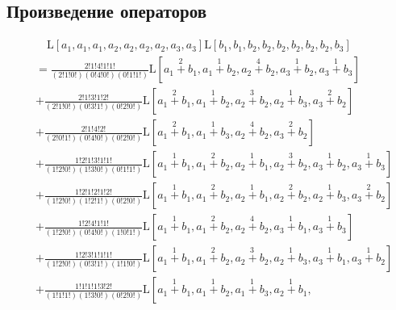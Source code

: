 
\subsection{Произведение операторов}

\begin{equation*} \begin{aligned}
& \quad
  \mathrm{L}[a_1, a_1, a_1, a_2, a_2, a_2, a_2, a_3, a_3] %
  \mathrm{L}[b_1, b_1, b_2, b_2, b_2, b_2, b_2, b_2, b_3] \\ &= %
  \frac{2!1!4!1!1!}{(2!1!0!)(0!4!0!)(0!1!1!)}
  \mathrm{L}\left[
  \stackrel{2}{a_1 + b_1},
  \stackrel{1}{a_1 + b_2},
  \stackrel{4}{a_2 + b_2},
  \stackrel{1}{a_3 + b_2},
  \stackrel{1}{a_3 + b_3}
  \right] \\ &
+ \frac{2!1!3!1!2!}{(2!1!0!)(0!3!1!)(0!2!0!)}
  \mathrm{L}\left[
  \stackrel{2}{a_1 + b_1},
  \stackrel{1}{a_1 + b_2},
  \stackrel{3}{a_2 + b_2},
  \stackrel{1}{a_2 + b_3},
  \stackrel{2}{a_3 + b_2}
  \right] \\ &
+ \frac{2!1!4!2!}{(2!0!1!)(0!4!0!)(0!2!0!)}
  \mathrm{L}\left[
  \stackrel{2}{a_1 + b_1},
  \stackrel{1}{a_1 + b_3},
  \stackrel{4}{a_2 + b_2},
  \stackrel{2}{a_3 + b_2}
  \right] \\ &
+ \frac{1!2!1!3!1!1!}{(1!2!0!)(1!3!0!)(0!1!1!)}
  \mathrm{L}\left[
  \stackrel{1}{a_1 + b_1},
  \stackrel{2}{a_1 + b_2},
  \stackrel{1}{a_2 + b_1},
  \stackrel{3}{a_2 + b_2},
  \stackrel{1}{a_3 + b_2},
  \stackrel{1}{a_3 + b_3}
  \right] \\ &
+ \frac{1!2!1!2!1!2!}{(1!2!0!)(1!2!1!)(0!2!0!)}
  \mathrm{L}\left[
  \stackrel{1}{a_1 + b_1},
  \stackrel{2}{a_1 + b_2},
  \stackrel{1}{a_2 + b_1},
  \stackrel{2}{a_2 + b_2},
  \stackrel{1}{a_2 + b_3},
  \stackrel{2}{a_3 + b_2}
  \right] \\ &
+ \frac{1!2!4!1!1!}{(1!2!0!)(0!4!0!)(1!0!1!)}
  \mathrm{L}\left[
  \stackrel{1}{a_1 + b_1},
  \stackrel{2}{a_1 + b_2},
  \stackrel{4}{a_2 + b_2},
  \stackrel{1}{a_3 + b_1},
  \stackrel{1}{a_3 + b_3}
  \right] \\ &
+ \frac{1!2!3!1!1!1!}{(1!2!0!)(0!3!1!)(1!1!0!)}
  \mathrm{L}\left[
  \stackrel{1}{a_1 + b_1},
  \stackrel{2}{a_1 + b_2},
  \stackrel{3}{a_2 + b_2},
  \stackrel{1}{a_2 + b_3},
  \stackrel{1}{a_3 + b_1},
  \stackrel{1}{a_3 + b_2}
  \right] \\ &
+ \frac{1!1!1!1!3!2!}{(1!1!1!)(1!3!0!)(0!2!0!)}
  \mathrm{L}\left[
  \stackrel{1}{a_1 + b_1},
  \stackrel{1}{a_1 + b_2},
  \stackrel{1}{a_1 + b_3},
  \stackrel{1}{a_2 + b_1},

\end{aligned}
\end{equation*}
